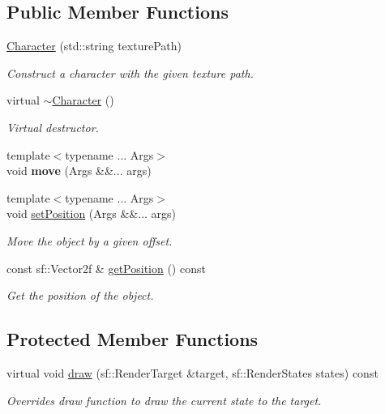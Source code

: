 \subsection*{Public Member Functions}
\begin{DoxyCompactItemize}
\item 
\mbox{\hyperlink{class_character_a9c0bcc7f37b218c920d014bf722037fa}{Character}} (std\+::string texture\+Path)
\begin{DoxyCompactList}\small\item\em Construct a character with the given texture path. \end{DoxyCompactList}\item 
\mbox{\label{class_character_a9e9be564d05ded80962b2045aa70b3fc}} 
virtual \mbox{\hyperlink{class_character_a9e9be564d05ded80962b2045aa70b3fc}{$\sim$\+Character}} ()
\begin{DoxyCompactList}\small\item\em Virtual destructor. \end{DoxyCompactList}\item 
\mbox{\label{class_character_a6e2226e97067453d9d4b131a8e0f9533}} 
{\footnotesize template$<$typename ... Args$>$ }\\void {\bfseries move} (Args \&\&... args)
\item 
{\footnotesize template$<$typename ... Args$>$ }\\void \mbox{\hyperlink{class_character_aeeced2dfcc027de98e223b4561760fa5}{set\+Position}} (Args \&\&... args)
\begin{DoxyCompactList}\small\item\em Move the object by a given offset. \end{DoxyCompactList}\item 
const sf\+::\+Vector2f \& \mbox{\hyperlink{class_character_aa07e2cfa12d28c14a1843455df396ee6}{get\+Position}} () const
\begin{DoxyCompactList}\small\item\em Get the position of the object. \end{DoxyCompactList}\end{DoxyCompactItemize}
\subsection*{Protected Member Functions}
\begin{DoxyCompactItemize}
\item 
virtual void \mbox{\hyperlink{class_character_a3812c72bf1cf8090f67a3387b5d96753}{draw}} (sf\+::\+Render\+Target \&target, sf\+::\+Render\+States states) const
\begin{DoxyCompactList}\small\item\em Overrides draw function to draw the current state to the target. \end{DoxyCompactList}\end{DoxyCompactItemize}
